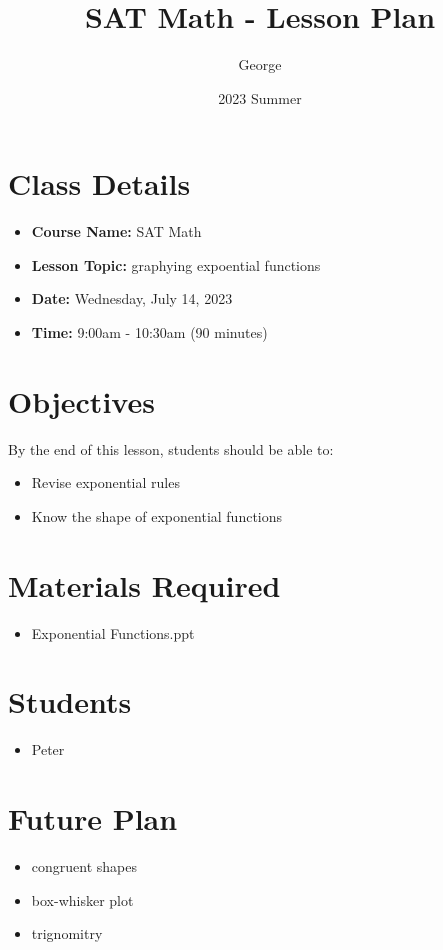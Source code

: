 \documentclass[12pt]{article}
\title{SAT Math - Lesson Plan}
\author{George}
\date{2023 Summer}
\begin{document}
\maketitle

\section{Class Details}
\begin{itemize}
    \item \textbf{Course Name:} SAT Math
    \item \textbf{Lesson Topic:}  graphying expoential functions
    \item \textbf{Date:} Wednesday, July 14, 2023
    \item \textbf{Time:} 9:00am - 10:30am (90 minutes)
\end{itemize}

\section{Objectives}
By the end of this lesson, students should be able to:
\begin{itemize}
    \item Revise exponential rules
    \item Know the shape of exponential functions


\end{itemize}

\section{Materials Required}
\begin{itemize}
   
    \item Exponential Functions.ppt
  
\end{itemize}


\section{Students}
\begin{itemize}
    \item Peter

\end{itemize}
\section{Future Plan}
\begin{itemize}
    \item congruent shapes
    \item box-whisker plot
    \item trignomitry

\end{itemize}
\end{document}
